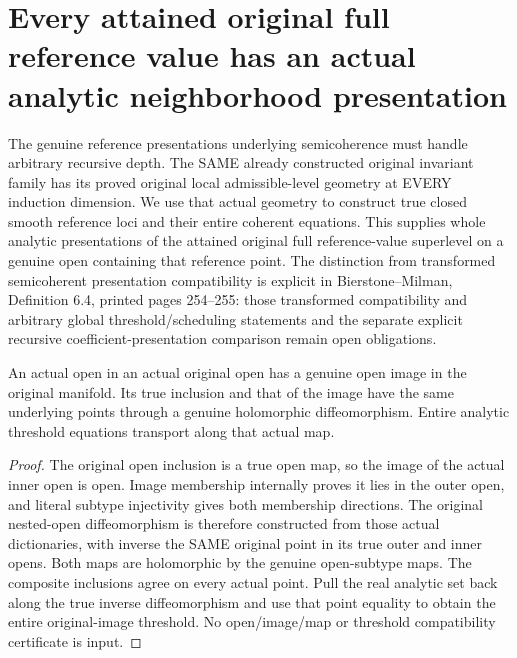 \section{Every attained original full reference value has an actual analytic neighborhood presentation}

The genuine reference presentations underlying semicoherence must handle
arbitrary recursive depth. The SAME already constructed original invariant
family has its proved original local admissible-level geometry at EVERY
induction dimension. We use that actual geometry to construct true closed
smooth reference loci and their entire coherent equations. This supplies
whole analytic presentations of
the attained original full reference-value superlevel on a genuine open
containing that reference point. The distinction from transformed
semicoherent presentation compatibility is explicit in
Bierstone--Milman\cite{bierstone-milman97-invent-math}, Definition 6.4,
printed pages 254--255: those transformed compatibility and arbitrary global
threshold/scheduling statements and the separate explicit recursive
coefficient-presentation comparison remain open obligations.

\begin{lemma}
\label{hir:original-reference-value-true-nested-open-analytic-transport}
\leanok
{}
An actual open in an actual original open has a genuine open image in the
original manifold. Its true inclusion and that of the image have the same
underlying points through a genuine holomorphic diffeomorphism. Entire
analytic threshold equations transport along that actual map.
\end{lemma}
\begin{proof}
The original open inclusion is a true open map, so the image of the actual
inner open is open. Image membership internally proves it lies in the outer
open, and literal subtype injectivity gives both membership directions.
The original nested-open diffeomorphism is therefore constructed from those
actual dictionaries, with inverse the SAME original point in its true outer
and inner opens. Both maps are holomorphic by the genuine open-subtype maps.
The composite inclusions agree on every actual point. Pull the real analytic
set back along the true inverse diffeomorphism and use that point equality
to obtain the entire original-image threshold. No open/image/map or threshold
compatibility certificate is input.
\end{proof}

